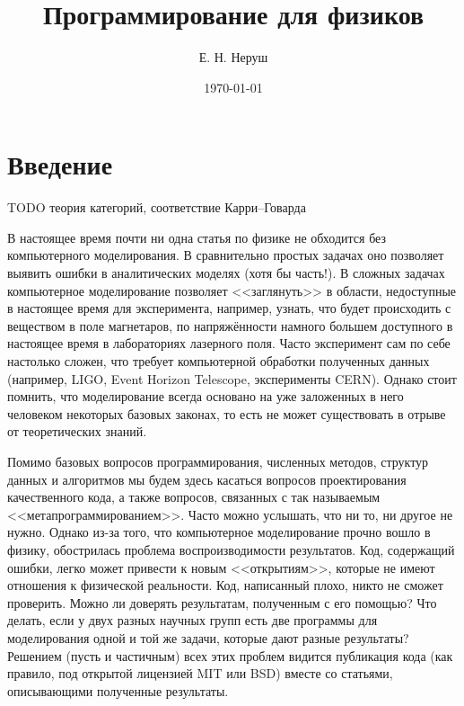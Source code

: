 \documentclass{book}
\begin{document}
\title{Программирование для физиков}

\date{\today}
\author{Е. Н. Неруш}


\maketitle

\tableofcontents

\section{Введение}

TODO теория категорий, соответствие Карри--Говарда

В настоящее время почти ни одна статья по физике не обходится без компьютерного моделирования. В
сравнительно простых задачах оно позволяет выявить ошибки в аналитических моделях (хотя бы часть!).
В сложных задачах компьютерное моделирование позволяет <<заглянуть>> в области, недоступные в
настоящее время для эксперимента, например, узнать, что будет происходить с веществом в поле
магнетаров, по напряжённости намного большем доступного в настоящее время в лабораториях лазерного
поля. Часто эксперимент сам по себе настолько сложен, что требует компьютерной обработки
полученных данных (например, LIGO,  Event Horizon Telescope, эксперименты CERN). Однако стоит
помнить, что моделирование всегда основано на уже заложенных в него человеком некоторых базовых
законах, то есть не может существовать в отрыве от теоретических знаний.

Помимо базовых вопросов программирования, численных методов, структур данных и алгоритмов мы будем
здесь касаться вопросов проектирования качественного кода, а также вопросов, связанных с так
называемым <<метапрограммированием>>. Часто можно услышать, что ни то, ни другое не нужно. Однако
из-за того, что компьютерное моделирование прочно вошло в физику, обострилась проблема
воспроизводимости результатов. Код, содержащий ошибки, легко может привести к новым <<открытиям>>,
которые не имеют отношения к физической реальности. Код, написанный плохо, никто не сможет
проверить. Можно ли доверять результатам, полученным с его помощью? Что делать, если у двух разных
научных групп есть две программы для моделирования одной и той же задачи, которые дают разные
результаты? Решением (пусть и частичным) всех этих проблем видится публикация кода (как правило,
под открытой лицензией MIT или BSD) вместе со статьями, описывающими полученные результаты.
\end{document}
